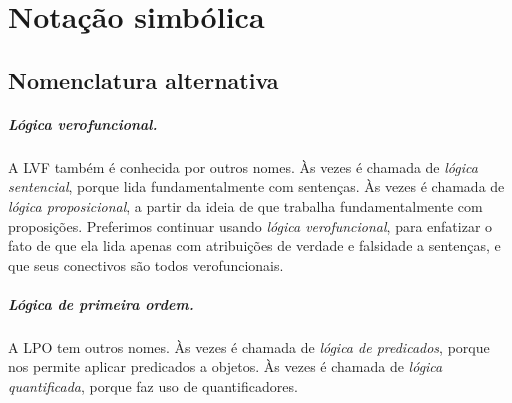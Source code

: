 
\chapter{Notação simbólica}
\label{app.notation}

\section{Nomenclatura alternativa}


\paragraph{Lógica verofuncional.} A LVF também é conhecida por outros nomes. Às vezes é chamada de \emph{lógica sentencial}, porque lida fundamentalmente com sentenças. Às vezes é chamada de \emph{lógica proposicional}, a partir da ideia de que trabalha fundamentalmente com proposições. Preferimos continuar usando \emph{lógica verofuncional}, para enfatizar o fato de que ela lida apenas com atribuições de verdade e falsidade a sentenças, e que seus conectivos são todos verofuncionais.


\paragraph{Lógica de primeira ordem.} A LPO tem outros nomes. Às vezes é chamada de \emph{lógica de predicados}, porque nos permite aplicar predicados a objetos. Às vezes é chamada de \emph{lógica quantificada}, porque faz uso de quantificadores. 

